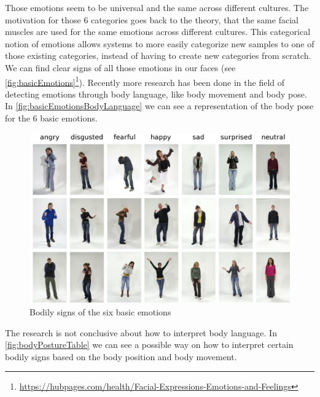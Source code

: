 \documentclass[conference]{IEEEtran}
\begin{document}
Those emotions seem to be universal and the same across different cultures\cite{ekmann1973universal}. The motivation for those 6 categories goes back to the theory, that the same facial muscles are used for the same emotions across different cultures\cite{schindler2008recognizing}. This categorical notion of emotions allows systems to more easily categorize new samples to one of those existing categories, instead of having to create new categories from scratch\cite{schindler2008recognizing}.
We can find clear signs of all those emotions in our faces (see \autoref{fig:basicEmotions}\footnote{\url{https://hubpages.com/health/Facial-Expressions-Emotions-and-Feelings}}). Recently more research has been done in the field of detecting emotions through body language, like body movement and body pose\cite{de2006towards,grezes2007perceiving,meeren2005rapid}. In \autoref{fig:basicEmotionsBodyLanguage} we can see a representation of the body pose for the 6 basic emotions. 
\begin{figure}
\centering
   \includegraphics[width=\linewidth]{basicEmotionsBodylanguage.jpg}
  \caption{Bodily signs of the six basic emotions\cite{schindler2008recognizing}}
  \label{fig:basicEmotionsBodyLanguage}
\end{figure}

The research is not conclusive about how to interpret body language. In \autoref{fig:bodyPostureTable} we can see a possible way on how to interpret certain bodily signs based on the body position and body movement\cite{singhsignificance}.
 
\end{document}
